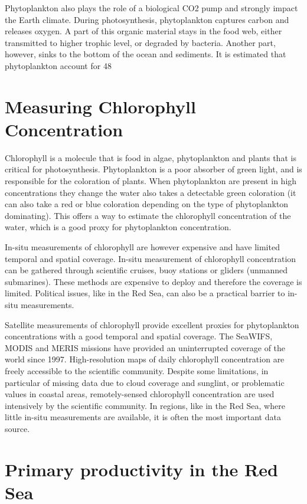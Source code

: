 Phytoplankton also plays the role of a biological CO2 pump and strongly impact the Earth climate. During photosynthesis, phytoplankton captures carbon and releases oxygen. A part of this organic material stays in the food web, either transmitted to higher trophic level, or degraded  by bacteria. Another part, however, sinks to the bottom of the ocean and sediments. It is estimated that phytoplankton account for 48%
\section{Measuring Chlorophyll Concentration}

Chlorophyll is a molecule that is food in algae, phytoplankton and plants that is critical for photosynthesis. Phytoplankton is a poor absorber of green light, and is responsible for the coloration of plants. When phytoplankton are present in high concentrations they change the water also takes a detectable green coloration (it can also take a red or blue coloration depending on the type of phytoplankton dominating). This offers a way to estimate the chlorophyll concentration of the water, which is a good proxy for phytoplankton concentration. 

In-situ measurements of chlorophyll are however expensive and have limited temporal and spatial coverage. In-situ measurement of chlorophyll concentration can be gathered through scientific cruises, buoy stations or gliders (unmanned submarines). These methods are expensive to deploy and therefore the coverage is limited. Political issues, like in the Red Sea, can also be a practical barrier to in-situ measurements. 

Satellite measurements of chlorophyll provide excellent proxies for phytoplankton concentrations with a good temporal and spatial coverage. The SeaWIFS, MODIS and MERIS missions have provided an uninterrupted coverage of the world since 1997. High-resolution maps of daily chlorophyll concentration are freely accessible to the scientific community. Despite some limitations, in particular of missing data due to cloud coverage and sunglint, or problematic values in coastal areas, remotely-sensed chlorophyll concentration are used intensively by the scientific community. In regions, like in the Red Sea, where little in-situ measurements are available, it is often the most important data source. 

\section{Primary productivity in the Red Sea}

